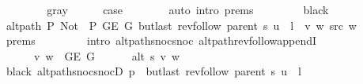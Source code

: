 \begin{isabellebody}
\ \ \isamarkupfalse%
\isanewline
\ \ \ \ \isamarkupfalse%
\ gray\isanewline
\ \ \ \ \isamarkupfalse%
\ {\isacharquery}{\kern0pt}case\isanewline
\ \ \ \ \ \ \isamarkupfalse%
\ {\isacharparenleft}{\kern0pt}auto\ intro{\isacharcolon}{\kern0pt}\ {\isachardoublequoteopen}{}{\isachardot}{\kern0pt}prems{\isachardoublequoteclose}{\isacharparenleft}{\kern0pt}{}{\isacharparenright}{\kern0pt}{\isacharparenright}{\kern0pt}\isanewline
\ \ \isamarkupfalse%
\isanewline
\ \ \ \ \isamarkupfalse%
\ black\isanewline
\ \ \ \ \isamarkupfalse%
\ {\isachardoublequoteopen}alt{\isacharunderscore}{\kern0pt}path\ P{\isacharprime}{\kern0pt}{\isacharprime}{\kern0pt}\ {\isacharparenleft}{\kern0pt}Not\ {\isasymcirc}\ P{\isacharprime}{\kern0pt}{\isacharprime}{\kern0pt}{\isacharparenright}{\kern0pt}\ {\isacharparenleft}{\kern0pt}G{\isachardot}{\kern0pt}E\ G{\isacharparenright}{\kern0pt}\ {\isacharparenleft}{\kern0pt}butlast\ {\isacharparenleft}{\kern0pt}rev{\isacharunderscore}{\kern0pt}follow\ {\isacharparenleft}{\kern0pt}parent\ s{\isacharparenright}{\kern0pt}\ u{\isacharparenright}{\kern0pt}\ {\isacharat}{\kern0pt}\ l\ {\isacharat}{\kern0pt}\ {\isacharbrackleft}{\kern0pt}v{\isacharcomma}{\kern0pt}\ w{\isacharbrackright}{\kern0pt}{\isacharparenright}{\kern0pt}\ src\ w{\isachardoublequoteclose}\isanewline
\ \ \ \ \ \ \isamarkupfalse%
\ {\isachardoublequoteopen}{}{\isachardot}{\kern0pt}prems{\isachardoublequoteclose}{\isacharparenleft}{\kern0pt}{}{\isacharcomma}{\kern0pt}\ {}{\isacharparenright}{\kern0pt}\isanewline
\ \ \ \ \ \ \isamarkupfalse%
\ {\isacharparenleft}{\kern0pt}intro\ alt{\isacharunderscore}{\kern0pt}path{\isacharunderscore}{\kern0pt}snoc{\isacharunderscore}{\kern0pt}snoc\ alt{\isacharunderscore}{\kern0pt}path{\isacharunderscore}{\kern0pt}rev{\isacharunderscore}{\kern0pt}follow{\isacharunderscore}{\kern0pt}appendI{\isacharparenright}{\kern0pt}\isanewline
\ \ \ \ \isamarkupfalse%
\isanewline
\ \ \ \ \ \ {\isachardoublequoteopen}{\isacharbraceleft}{\kern0pt}v{\isacharcomma}{\kern0pt}\ w{\isacharbraceright}{\kern0pt}\ {\isasymin}\ G{\isachardot}{\kern0pt}E\ G{\isachardoublequoteclose}\isanewline
\ \ \ \ \ \ {\isachardoublequoteopen}alt\ s\ v\ w{\isachardoublequoteclose}\isanewline
\ \ \ \ \ \ \isamarkupfalse%
\ black\ alt{\isacharunderscore}{\kern0pt}path{\isacharunderscore}{\kern0pt}snoc{\isacharunderscore}{\kern0pt}snocD{\isacharbrackleft}{\kern0pt}\ {\isacharquery}{\kern0pt}p\ {\isacharequal}{\kern0pt}\ {\isachardoublequoteopen}butlast\ {\isacharparenleft}{\kern0pt}rev{\isacharunderscore}{\kern0pt}follow\ {\isacharparenleft}{\kern0pt}parent\ s{\isacharparenright}{\kern0pt}\ u{\isacharparenright}{\kern0pt}\ {\isacharat}{\kern0pt}\ l{\isachardoublequoteclose}{\isacharbrackright}{\kern0pt}\isanewline

\end{isabellebody}
